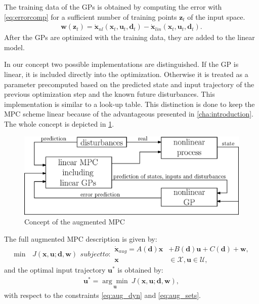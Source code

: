 The training data of the GPs is obtained by computing the error with \ref{eq:errorcomp} for a sufficient number of training points $\mathbf{z}_t$ of the input space.
\begin{align}
\mathbf{w} \left( \mathbf{z}_t \right) = \dot{\mathbf{x}}_{nl} \left( \mathbf{x}_t,\mathbf{u}_t,\mathbf{d}_t \right) - \dot{\mathbf{x}}_{lin} \left( \mathbf{x}_t,\mathbf{u}_t,\mathbf{d}_t \right). \label{eq:errorcomp}
\end{align}
After the GPs are optimized with the training data, they are added to the linear model.

In our concept two possible implementations are distinguished.
If the GP is linear, it is included directly into the optimization.
Otherwise it is treated as a parameter precomputed based on the predicted state and input trajectory of the previous optimization step and the known future disturbances.
This implementation is similar to a look-up table.
This distinction is done to keep the MPC scheme linear because of the advantageous presented in \cref{cha:introduction}.
The whole concept is depicted in \cref{fig:concept_controller}.

\begin{figure}[t]
\begin{center}
	\includegraphics[width=\textwidth]{../Figures/concept_controller.eps}
	\caption{Concept of the augmented MPC}
	\label{fig:concept_controller}
\end{center}
\end{figure}

The full augmented MPC description is given by:
\begin{subequations}\label{eq:description_aug}
\begin{align}
\min \, &J(\mathbf{x},\mathbf{u};\mathbf{d},\mathbf{w})
\end{align}
subject to:
\begin{align}
\dot{\mathbf{x}}_{aug} = A \left( \mathbf{d} \right) \mathbf{x} &+ B \left( \mathbf{d} \right) \mathbf{u} + C \left( \mathbf{d} \right) + \mathbf{w},\label{eq:aug_dyn}\\
\mathbf{x} &\in \mathcal{X}, \mathbf{u} \in \mathcal{U},\label{eq:aug_sets}
\end{align}
\end{subequations}
and the optimal input trajectory $\mathbf{u}^*$ is obtained by:
\begin{align}
\mathbf{u}^* = \underset{\mathbf{u}}{\arg\min}~J(\mathbf{x},\mathbf{u};\mathbf{d},\mathbf{w}), \label{eq:uoptaug}
\end{align}
with respect to the constraints \eqref{eq:aug_dyn} and \eqref{eq:aug_sets}.

